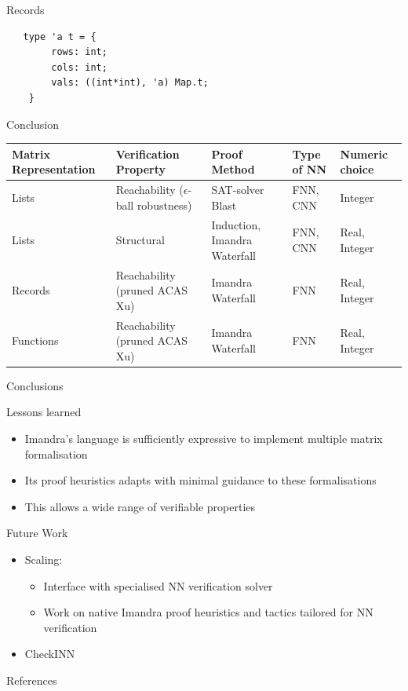 \documentclass{beamer}
\begin{document}
\begin{frame}[fragile]{Records}
	\begin{lstlisting}
   type 'a t = {
		rows: int;
		cols: int;
		vals: ((int*int), 'a) Map.t;
	}
	\end{lstlisting}
\end{frame}

\begin{frame}{Conclusion}
	\scriptsize
	\begin{tabular}{ p{1.4cm} p{3cm} p{2.5cm} p{1cm} p{1.0cm} }
		\toprule
		\textbf{Matrix Representation} & \textbf{Verification Property} & \textbf{Proof Method}  & \textbf{Type of NN} & \textbf{Numeric choice} \\ 
		\midrule
		\rowcolor{lavender}
		Lists &	Reachability ($\epsilon$-ball robustness) & SAT-solver Blast & FNN, CNN & Integer  \\
		
		Lists & Structural & Induction, Imandra Waterfall & FNN, CNN  & Real, Integer  \\
		
		
		\rowcolor{lavender}
		Records & Reachability (pruned ACAS Xu) & Imandra Waterfall & FNN & Real, Integer \\
		
		Functions  &	Reachability (pruned ACAS Xu) &  Imandra Waterfall & FNN & Real, Integer  \\
		\bottomrule
	\end{tabular}
\end{frame}

\begin{frame}{Conclusions}
	\begin{block}{Lessons learned}
		\begin{itemize}
			\item<1-> Imandra's language is sufficiently expressive to implement multiple matrix formalisation
			\item<2-> Its proof heuristics adapts with minimal guidance to these formalisations
			\item<3-> This allows a wide range of verifiable properties
		\end{itemize}
	\end{block}
\end{frame}

\begin{frame}{Future Work}
	\begin{itemize}
	\item Scaling: 
		\begin{itemize}
			\item<1-> Interface with specialised NN verification solver
			\item<2-> Work on native Imandra proof heuristics and tactics tailored for NN verification
		\end{itemize}
	\item<4-> CheckINN
	\end{itemize}
\end{frame}

\begin{frame}[shrink=40]{References}
\printbibliography
\end{frame}
\end{document}
